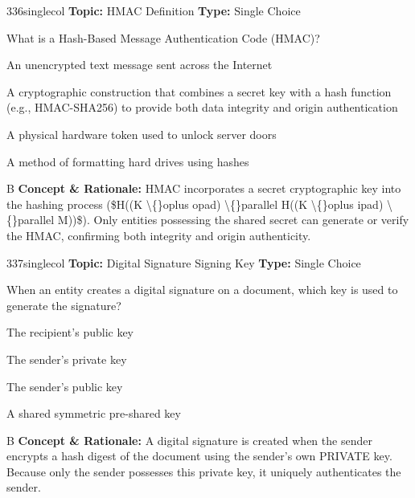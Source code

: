 \begin{qcard}{336}{singlecol}
\textcolor{darkslate!75}{\small\textbf{Topic:} HMAC Definition \hfill \textbf{Type:} Single Choice}\vspace{0.4em}\par
What is a Hash-Based Message Authentication Code (HMAC)?
\begin{qoptions}
\item An unencrypted text message sent across the Internet
\item A cryptographic construction that combines a secret key with a hash function (e.g., HMAC-SHA256) to provide both data integrity and origin authentication
\item A physical hardware token used to unlock server doors
\item A method of formatting hard drives using hashes
\end{qoptions}
\end{qcard}
\nopagebreak
\begin{explainbox}{B}
\textbf{Concept \& Rationale:} HMAC incorporates a secret cryptographic key into the hashing process (\$H((K \textbackslash\{\}oplus opad) \textbackslash\{\}parallel H((K \textbackslash\{\}oplus ipad) \textbackslash\{\}parallel M))\$). Only entities possessing the shared secret can generate or verify the HMAC, confirming both integrity and origin authenticity.
\end{explainbox}

\begin{qcard}{337}{singlecol}
\textcolor{darkslate!75}{\small\textbf{Topic:} Digital Signature Signing Key \hfill \textbf{Type:} Single Choice}\vspace{0.4em}\par
When an entity creates a digital signature on a document, which key is used to generate the signature?
\begin{qoptions}
\item The recipient's public key
\item The sender's private key
\item The sender's public key
\item A shared symmetric pre-shared key
\end{qoptions}
\end{qcard}
\nopagebreak
\begin{explainbox}{B}
\textbf{Concept \& Rationale:} A digital signature is created when the sender encrypts a hash digest of the document using the sender's own PRIVATE key. Because only the sender possesses this private key, it uniquely authenticates the sender.
\end{explainbox}

